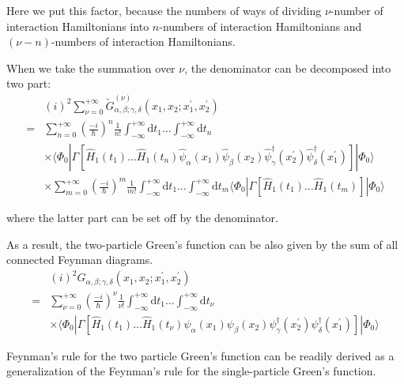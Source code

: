 Here we put this factor, because the numbers of ways of dividing $\nu$-number of interaction Hamiltonians into $n$-numbers of interaction Hamiltonians and $(\nu-n)$-numbers of interaction Hamiltonians.

When we take the summation over $\nu$, the denominator can be decomposed into two part:
\[ \begin{split} &(i)^2\sum_{\nu=0}^{+\infty}\tilde{G}^{(\nu)}_{\alpha,\beta;\gamma,\delta}(x_1,x_2;x_1^{'},x_2^{'}) \\
=& \sum_{n=0}^{+\infty}\left( \frac{-i}{\hbar} \right)^n \frac{1}{n!} \int_{-\infty}^{+\infty}\mathrm{d}t_1 \ldots \int_{-\infty}^{+\infty}\mathrm{d}t_n\\&\times
\langle \Phi_0 | \Gamma[\hat{H}_1(t_1)\ldots\hat{H}_1(t_n)\hat{\psi}_\alpha(x_1) \hat{\psi}_\beta(x_2) \hat{\psi}_\gamma^\dagger(x_2^{'}) \hat{\psi}_\delta^\dagger(x_1^{'})]|\Phi_0\rangle\\
&\times\sum_{m=0}^{+\infty}\left( \frac{-i}{\hbar} \right)^m \frac{1}{m!} \int_{-\infty}^{+\infty}\mathrm{d}t_1 \ldots \int_{-\infty}^{+\infty}\mathrm{d}t_m
\langle \Phi_0 | \Gamma[\hat{H}_1(t_1)\ldots\hat{H}_1(t_m)]|\Phi_0\rangle
\end{split} \]

where the latter part can be set off by the denominator.

As a result, the two-particle Green's function can be also given by the sum of all connected Feynman diagrams.
\[ \begin{split} &(i)^2 G_{\alpha,\beta;\gamma,\delta}(x_1,x_2;x_1^{'},x_2^{'}) \\
=& \sum_{\nu=0}^{+\infty}\left( \frac{-i}{\hbar} \right)^\nu \frac{1}{\nu!} \int_{-\infty}^{+\infty}\mathrm{d}t_1 \ldots \int_{-\infty}^{+\infty}\mathrm{d}t_\nu\\&\times
\langle \Phi_0 | \Gamma[\hat{H}_1(t_1)\ldots\hat{H}_1(t_\nu) \psi_\alpha(x_1) \psi_\beta(x_2) \psi_\gamma^\dagger(x_2^{'}) \psi_\delta^\dagger(x_1^{'})]|\Phi_0\rangle
\end{split} \]

Feynman's rule for the two particle Green's function can be readily derived as a generalization of the Feynman's rule for the single-particle Green's function.

